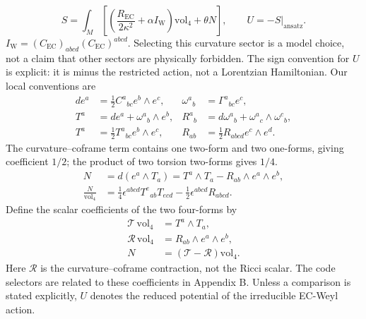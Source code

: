 \begin{equation}
S=\int_M\left[\left(\frac{R_{\mathrm{EC}}}{2\kappa^2}
+\alpha I_{\mathrm{W}}\right)\mathrm{vol}_4+\theta N\right],
\qquad U=-S\big|_{\mathrm{ansatz}}.
\tag{A}\label{eq:A}
\end{equation}
$I_{\mathrm{W}}=(C_{\mathrm{EC}})_{abcd}(C_{\mathrm{EC}})^{abcd}$. Selecting this curvature sector is a model choice, not a claim that other sectors are physically forbidden. The sign convention for $U$ is explicit: it is minus the restricted action, not a Lorentzian Hamiltonian. Our local conventions are
\begin{equation}
\begin{aligned}
de^a&=\frac12 C^a{}_{bc}e^b\wedge e^c,
&\omega^a{}_b&=\Gamma^a{}_{bc}e^c,\\
T^a&=de^a+\omega^a{}_b\wedge e^b,
&R^a{}_b&=d\omega^a{}_b+\omega^a{}_c\wedge\omega^c{}_b,\\
T^a&=\frac12 T^a{}_{bc}e^b\wedge e^c,
&R_{ab}&=\frac12 R_{abcd}e^c\wedge e^d.
\end{aligned}
\tag{C}\label{eq:C}
\end{equation}
The curvature--coframe term contains one two-form and two one-forms, giving coefficient $1/2$; the product of two torsion two-forms gives $1/4$.\cite{NiehYan1982,Chandia1997}
\begin{equation}
\begin{aligned}
N&=d(e^a\wedge T_a)=T^a\wedge T_a-R_{ab}\wedge e^a\wedge e^b,\\
\frac{N}{\mathrm{vol}_4}
&=\frac14\epsilon^{abcd}T^e{}_{ab}T_{ecd}
-\frac12\epsilon^{abcd}R_{abcd}.
\end{aligned}
\tag{NY}\label{eq:NY}
\end{equation}
Define the scalar coefficients of the two four-forms by
\begin{equation}
\begin{aligned}
\mathcal T\,\mathrm{vol}_4&=T^a\wedge T_a,\\
\mathcal R\,\mathrm{vol}_4&=R_{ab}\wedge e^a\wedge e^b,\\
N&=(\mathcal T-\mathcal R)\mathrm{vol}_4.
\end{aligned}\tag{NYD}\label{eq:NYD}
\end{equation}
Here $\mathcal R$ is the curvature--coframe contraction, not the Ricci scalar. The code selectors are related to these coefficients in Appendix B. Unless a comparison is stated explicitly, $U$ denotes the reduced potential of the irreducible EC-Weyl action.

